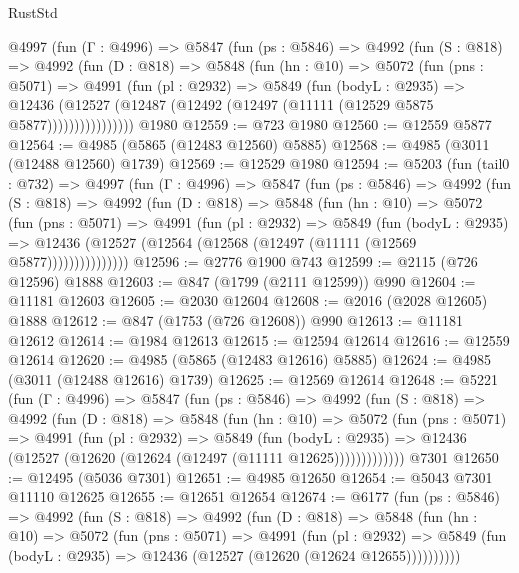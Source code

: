 \begin{lexlean}{RustStd}
\begin{coremodule}
      @4997
        (fun (Γ : @4996) =>
        @5847
          (fun (ps : @5846) =>
          @4992
            (fun (S : @818) =>
            @4992
              (fun (D : @818) =>
              @5848
                (fun (hn : @10) =>
                @5072
                  (fun (pns : @5071) =>
                  @4991
                    (fun (pl : @2932) =>
                    @5849
                      (fun (bodyL : @2935) =>
                      @12436
                        (@12527 (@12487 (@12492 (@12497 (@11111 (@12529 @5875 @5877))))))))))))))))
    @1980
@12559 := @723 @1980
@12560 := @12559 @5877
@12564 := @4985 (@5865 (@12483 @12560) @5885)
@12568 := @4985 (@3011 (@12488 @12560) @1739)
@12569 := @12529 @1980
@12594 := @5203
    (fun (tail0 : @732) =>
    @4997
      (fun (Γ : @4996) =>
      @5847
        (fun (ps : @5846) =>
        @4992
          (fun (S : @818) =>
          @4992
            (fun (D : @818) =>
            @5848
              (fun (hn : @10) =>
              @5072
                (fun (pns : @5071) =>
                @4991
                  (fun (pl : @2932) =>
                  @5849
                    (fun (bodyL : @2935) =>
                    @12436 (@12527 (@12564 (@12568 (@12497 (@11111 (@12569 @5877)))))))))))))))
@12596 := @2776 @1900 @743
@12599 := @2115 (@726 @12596) @1888
@12603 := @847 (@1799 (@2111 @12599)) @990
@12604 := @11181 @12603
@12605 := @2030 @12604
@12608 := @2016 (@2028 @12605) @1888
@12612 := @847 (@1753 (@726 @12608)) @990
@12613 := @11181 @12612
@12614 := @1984 @12613
@12615 := @12594 @12614
@12616 := @12559 @12614
@12620 := @4985 (@5865 (@12483 @12616) @5885)
@12624 := @4985 (@3011 (@12488 @12616) @1739)
@12625 := @12569 @12614
@12648 := @5221
    (fun (Γ : @4996) =>
    @5847
      (fun (ps : @5846) =>
      @4992
        (fun (S : @818) =>
        @4992
          (fun (D : @818) =>
          @5848
            (fun (hn : @10) =>
            @5072
              (fun (pns : @5071) =>
              @4991
                (fun (pl : @2932) =>
                @5849
                  (fun (bodyL : @2935) =>
                  @12436 (@12527 (@12620 (@12624 (@12497 (@11111 @12625)))))))))))))
    @7301
@12650 := @12495 (@5036 @7301)
@12651 := @4985 @12650
@12654 := @5043 @7301 @11110 @12625
@12655 := @12651 @12654
@12674 := @6177
    (fun (ps : @5846) =>
    @4992
      (fun (S : @818) =>
      @4992
        (fun (D : @818) =>
        @5848
          (fun (hn : @10) =>
          @5072
            (fun (pns : @5071) =>
            @4991
              (fun (pl : @2932) =>
              @5849 (fun (bodyL : @2935) => @12436 (@12527 (@12620 (@12624 @12655))))))))))

\end{coremodule}
\end{lexlean}
